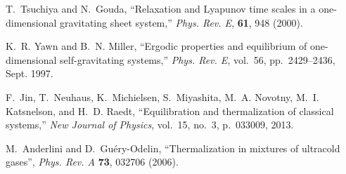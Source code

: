 \documentclass[onecolumn,pra]{revtex4-1}
\begin{document}
\begin{thebibliography}{1}
T.~Tsuchiya and N.~Gouda, ``Relaxation and Lyapunov time scales in a
  one-dimensional gravitating sheet system,'' {\em Phys. Rev. E}, {\bf 61}, 948 (2000).

K.~R. Yawn and B.~N. Miller, ``Ergodic properties and equilibrium of
  one-dimensional self-gravitating systems,'' {\em Phys. Rev. E}, vol.~56,
  pp.~2429--2436, Sept. 1997.

F.~Jin, T.~Neuhaus, K.~Michielsen, S.~Miyashita, M.~A. Novotny, M.~I.
  Katsnelson, and H.~D. Raedt, ``Equilibration and thermalization of classical
  systems,'' {\em New Journal of Physics}, vol.~15, no.~3, p.~033009, 2013.

 M.~Anderlini and D.~Gu\'ery-Odelin, ``Thermalization in
  mixtures of ultracold gases'', {\em Phys. Rev. A} {\bf 73}, 032706 (2006).

  
\end{thebibliography}




 
\end{document}
